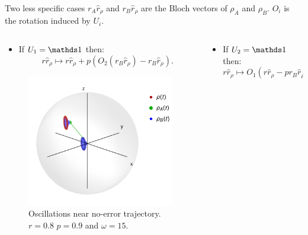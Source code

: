 \begin{frame}{Two less specific cases}
     $r_{A}\hat{r}_{\rho}$ and $r_{B}\hat{r}_{\rho}$ are the Bloch vectors of $\rho_{A}$ and $\rho_{B}$. $O_{i}$ is the rotation induced by $U_{i}$.
    \begin{columns}
        \begin{column}{0.5\textwidth}
            \begin{itemize}
                \item If $U_{1}=\Id$ then:
                \begin{equation*}
                    r\hat{r}_{\rho}\mapsto r\hat{r}_{\rho}+p(O_{2}(r_{B}\hat{r}_{\rho})-r_{B}\hat{r}_{\rho}).
                \end{equation*}
            \end{itemize}
            \begin{figure}[h!]
                \includegraphics[width=0.6\columnwidth]{figures/U1xU2_H1=Id_H2=sz_z=0.8_p=0.6_sequence.png}%
                \caption{Oscillations near no-error trajectory.\\ $r=0.8$ $p=0.9$ and $\omega=15$. }
            \end{figure}
        \end{column}
        \begin{column}{0.5\textwidth}
            \begin{itemize}
                \item If $U_{2}=\Id$ then:
                \begin{equation*}
                    r\hat{r}_{\rho}\mapsto O_{1}(r\hat{r}_{\rho}-pr_{B}\hat{r}_{\rho})+pr_{B}\hat{r}_{\rho}.
                \end{equation*}
            \end{itemize}
            \begin{figure}[h!]

\end{figure}
\end{column}
\end{columns}
\end{frame}
